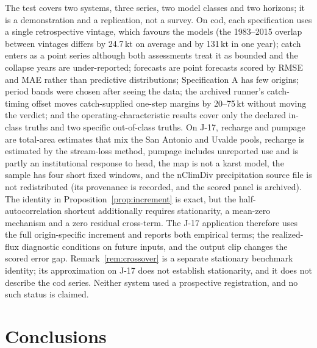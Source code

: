 \documentclass[preprint,11pt,authoryear]{elsarticle}
\theoremstyle{definition}
\theoremstyle{remark}
\begin{document}
The test covers two systems, three series, two model classes and two horizons; it is a demonstration and a replication, not a survey. On cod, each specification uses a single retrospective vintage, which favours the models (the 1983--2015 overlap between vintages differs by 24.7\,kt on average and by 131\,kt in one year); catch enters as a point series although both assessments treat it as bounded and the collapse years are under-reported; forecasts are point forecasts scored by RMSE and MAE rather than predictive distributions; Specification A has few origins; period bands were chosen after seeing the data; the archived runner's catch-timing offset moves catch-supplied one-step margins by 20--75\,kt without moving the verdict; and the operating-characteristic results cover only the declared in-class truths and two specific out-of-class truths. On J-17, recharge and pumpage are total-area estimates that mix the San Antonio and Uvalde pools, recharge is estimated by the stream-loss method, pumpage includes unreported use and is partly an institutional response to head, the map is not a karst model, the sample has four short fixed windows, and the nClimDiv precipitation source file is not redistributed (its provenance is recorded, and the scored panel is archived). The identity in Proposition~\ref{prop:increment} is exact, but the half-autocorrelation shortcut additionally requires stationarity, a mean-zero mechanism and a zero residual cross-term. The J-17 application therefore uses the full origin-specific increment and reports both empirical terms; the realized-flux diagnostic conditions on future inputs, and the output clip changes the scored error gap. Remark~\ref{rem:crossover} is a separate stationary benchmark identity; its approximation on J-17 does not establish stationarity, and it does not describe the cod series. Neither system used a prospective registration, and no such status is claimed.

\section{Conclusions}\label{sec:conclusions}
\end{document}

